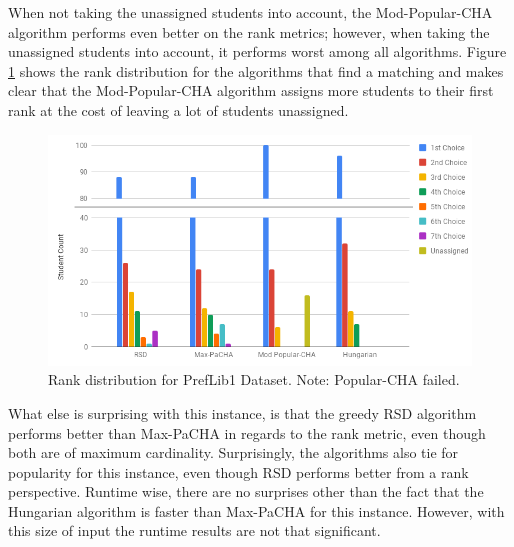 When not taking the unassigned students into account, the Mod-Popular-CHA algorithm performs even better on the rank metrics; however, when taking the unassigned students into account, it performs worst among all algorithms. Figure \ref{fig:preflib1-rank-distribution} shows the rank distribution for the algorithms that find a matching and makes clear that the Mod-Popular-CHA algorithm assigns more students to their first rank at the cost of leaving a lot of students unassigned. 

\begin{figure}[h!]
  \centering
    \includegraphics[width=0.75\linewidth]{assets/plots/preflib1-cropped.png}
    \caption{Rank distribution for PrefLib1 Dataset. Note: Popular-CHA failed.}
    \label{fig:preflib1-rank-distribution}
\end{figure}

What else is surprising with this instance, is that the greedy RSD algorithm performs better than Max-PaCHA in regards to the rank metric, even though both are of maximum cardinality. Surprisingly, the algorithms also tie for popularity for this instance, even though RSD performs better from a rank perspective. Runtime wise, there are no surprises other than the fact that the Hungarian algorithm is faster than Max-PaCHA for this instance. However, with this size of input the runtime results are not that significant.

